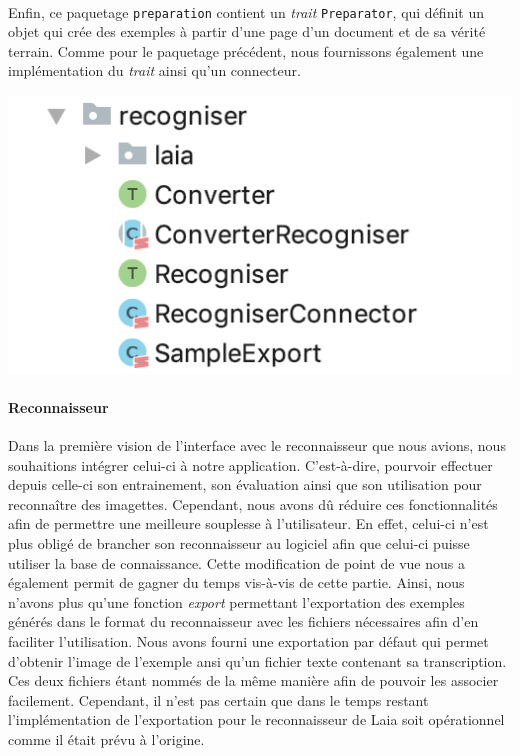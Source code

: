 \paragraph{}
Enfin, ce paquetage \texttt{preparation} contient un \textit{trait} \texttt{Preparator}, qui définit un objet qui crée des exemples à partir d'une page d'un document et de sa vérité terrain. Comme pour le paquetage précédent, nous fournissons également une implémentation du \textit{trait} ainsi qu'un connecteur.

\begin{mdframed}[frametitle={Figure 1 : Paquetage \texttt{recogniser}}, innerbottommargin=10]
\begin{center}
\includegraphics[scale=0.7]{assets/recogniser.png}
\end{center}
\end{mdframed}

\paragraph{Reconnaisseur}
Dans la première vision de l'interface avec le reconnaisseur que nous avions, nous souhaitions intégrer celui-ci à notre application. C'est-à-dire, pourvoir effectuer depuis celle-ci son entrainement, son évaluation ainsi que son utilisation pour reconnaître des imagettes. Cependant, nous avons dû réduire ces fonctionnalités afin de permettre une meilleure souplesse à l'utilisateur. En effet, celui-ci n'est plus obligé de brancher son reconnaisseur au logiciel afin que celui-ci puisse utiliser la base de connaissance. Cette modification de point de vue nous a également permit de gagner du temps vis-à-vis de cette partie. Ainsi, nous n'avons plus qu'une fonction \textit{export} permettant l'exportation des exemples générés dans le format du reconnaisseur avec les fichiers nécessaires afin d'en faciliter l'utilisation.
Nous avons fourni une exportation par défaut qui permet d'obtenir l'image de l'exemple ansi qu'un fichier texte contenant sa transcription. Ces deux fichiers étant nommés de la même manière afin de pouvoir les associer facilement.
Cependant, il n'est pas certain que dans le temps restant l'implémentation de l'exportation pour le reconnaisseur de Laia soit opérationnel comme il était prévu à l'origine.


